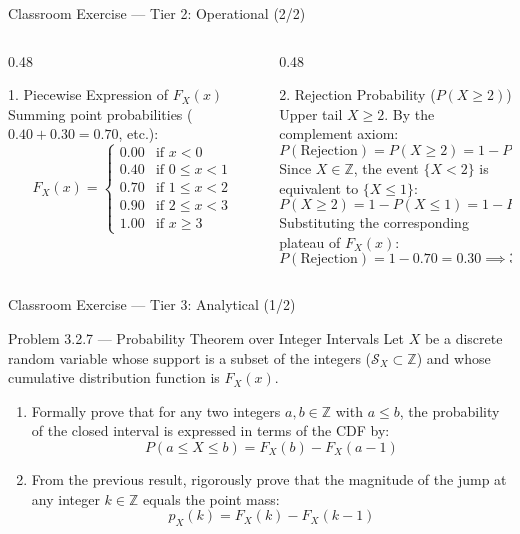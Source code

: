 \documentclass[aspectratio=169,xcolor={dvipsnames,table}]{beamer}
\begin{document}
\begin{frame}{Classroom Exercise --- Tier 2: Operational (2/2)}
	\begin{columns}[T]
		\begin{column}{0.48\textwidth}
			\begin{block}{1. Piecewise Expression of $F_X(x)$}
				\fontsize{6.5pt}{7.8pt}\selectfont
				Summing point probabilities ($0.40 + 0.30 = 0.70$, etc.):
				$$F_X(x) = \begin{cases}
					0.00 & \text{if } x < 0 \\
					0.40 & \text{if } 0 \le x < 1 \\
					0.70 & \text{if } 1 \le x < 2 \\
					0.90 & \text{if } 2 \le x < 3 \\
					1.00 & \text{if } x \ge 3
				\end{cases}$$
			\end{block}
		\end{column}
		\begin{column}{0.48\textwidth}
			\begin{alertblock}{2. Rejection Probability ($P(X \ge 2)$)}
				\fontsize{6.5pt}{7.8pt}\selectfont
				Upper tail $X \ge 2$. By the complement axiom:
				$$P(\text{Rejection}) = P(X \ge 2) = 1 - P(X < 2)$$
				Since $X \in \mathbb{Z}$, the event $\{X < 2\}$ is equivalent to $\{X \le 1\}$:
				$$P(X \ge 2) = 1 - P(X \le 1) = 1 - F_X(1)$$
				Substituting the corresponding plateau of $F_X(x)$:
				$$P(\text{Rejection}) = 1 - 0.70 = \mathbf{0.30 \implies 30.0\%}$$
			\end{alertblock}
		\end{column}
	\end{columns}
\end{frame}

\begin{frame}{Classroom Exercise --- Tier 3: Analytical (1/2)}
	\begin{block}{Problem 3.2.7 --- Probability Theorem over Integer Intervals}
		\footnotesize
		Let $X$ be a discrete random variable whose support is a subset of the integers ($\mathcal{S}_X \subset \mathbb{Z}$) and whose cumulative distribution function is $F_X(x)$.
		\begin{enumerate}\itemsep=0.15cm
			\item Formally prove that for any two integers $a, b \in \mathbb{Z}$ with $a \le b$, the probability of the closed interval is expressed in terms of the CDF by:
			$$P(a \le X \le b) = F_X(b) - F_X(a - 1)$$
			\item From the previous result, rigorously prove that the magnitude of the jump at any integer $k \in \mathbb{Z}$ equals the point mass:
			$$p_X(k) = F_X(k) - F_X(k-1)$$
		\end{enumerate}
	\end{block}
\end{frame}
\end{document}
